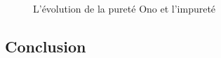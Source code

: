 \documentclass[12pt]{article}
\begin{document}
\begin{figure}[H]
{\begin{minipage}{0.8\textwidth}
        \end{minipage}
    }
    \caption{L'évolution de la pureté Ono et l'impureté}
    \label{fig:regression}
\end{figure}
































\subsection{Conclusion}
\end{document}
